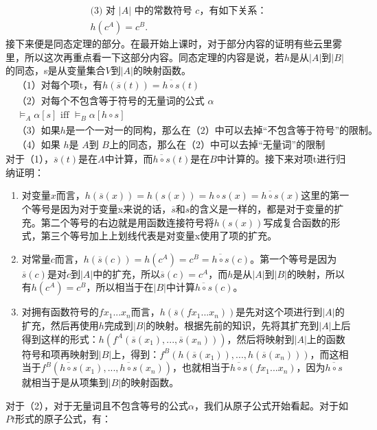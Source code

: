 \documentclass{article}
\begin{document}
\[
\begin{gathered}
    \text{(3) 对 } |A| \text{ 中的常数符号 } c \text{，有如下关系：} \\
    h(c^A) = c^B.
\end{gathered}
\]
接下来便是同态定理的部分。在最开始上课时，对于部分内容的证明有些云里雾里，所以这次再重点看一下这部分内容。同态定理的内容是说，若$h$是从$|A|$到$|B|$的同态，s是从变量集合$V$到$|A|$的映射函数。
\begin{align*}
    & \text{（1）对每个项t，有}h(\overline{s}(t))=\overline{h \circ s}(t) \\
    & \text{（2）对每个不包含等于符号的无量词的公式 }\alpha \\
    & \models_A \alpha[s] \text{  iff  } \models_B \alpha[h \circ s] \\
    & \text{（3）如果}h\text{是一个一对一的同构，那么在（2）中可以去掉“不包含等于符号”的限制。 } \\
    & \text{（4）如果 }h\text{是 }A\text{到 }B\text{上的同态，那么在（2）中可以去掉“无量词”的限制 }
\end{align*}
对于（1），$\overline{s}(t)$是在$A$中计算，而$\overline{h \circ s}(t)$是在$B$中计算的。接下来对项t进行归纳证明：
\begin{enumerate}
    \item 对变量$x$而言，$h(\overline{s}(x))=h(s(x))=h \circ s(x)=\overline{h \circ s}(x)$这里的第一个等号是因为对于变量x来说的话，$\overline{s}$和$s$的含义是一样的，都是对于变量的扩充。第二个等号的右边就是用函数连接符号将$h(s(x))$写成复合函数的形式，第三个等号加上上划线代表是对变量x使用了项的扩充。
    \item 对常量$c$而言，$h(\overline{s}(c))=h(c^A)=c^B=\overline{h \circ s}(c)$。第一个等号是因为$\overline{s}(c)$是对$c$到$|A|$中的扩充，所以$\overline{s}(c)=c^A$，而$h$是从$|A|$到$|B|$的映射，所以有$h(c^A)=c^B$，所以相当于在$|B|$中计算$\overline{h \circ s}(c)$。
    \item 对拥有函数符号的$fx_1...x_n$而言，$h(\overline{s}(fx_1...x_n))$是先对这个项进行到$|A|$的扩充，然后再使用$h$完成到$|B|$的映射。根据先前的知识，先将其扩充到$|A|$上后得到这样的形式：$h(f^A(\overline{s}(x_1),...,\overline{s}(x_n)))$，然后将映射到$|A|$上的函数符号和项再映射到$|B|$上，得到：$f^B(h(\overline{s}(x_1)),...,h(\overline{s}(x_n)))$，而这相当于$f^B(\overline{h \circ s}(x_1),...,\overline{h \circ s}(x_n))$，也就相当于$\overline{h \circ s}(fx_1...x_n)$，因为$\overline{h \circ s}$就相当于是从项集到$|B|$的映射函数。
\end{enumerate}
对于（2），对于无量词且不包含等号的公式$\alpha$，我们从原子公式开始看起。对于如$Pt$形式的原子公式，有：
\end{document}
